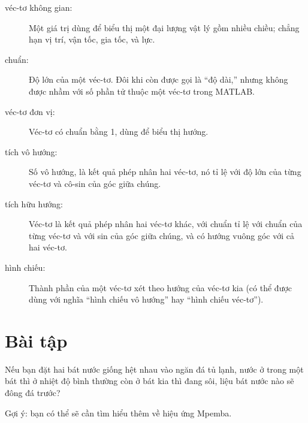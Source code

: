 \documentclass[12pt]{book}
\begin{document}
\begin{description}

\item[véc-tơ không gian:] Một giá trị dùng để biểu thị một đại lượng
vật lý gồm nhiều chiều; chẳng hạn vị trí, vận tốc, gia tốc, và lực.

\item[chuẩn:] Độ lớn của một véc-tơ. Đôi khi còn được gọi là ``độ dài,''
nhưng không được nhầm với số phần tử thuộc một véc-tơ trong MATLAB.

\item[véc-tơ đơn vị:] Véc-tơ có chuẩn bằng 1, dùng để biểu thị hướng.

\item[tích vô hướng:] Số vô hướng, là kết quả phép nhân hai véc-tơ, nó tỉ lệ với
độ lớn của từng véc-tơ và cô-sin của góc giữa chúng.

\item[tích hữu hướng:] Véc-tơ là kết quả phép nhân hai véc-tơ khác, với
chuẩn tỉ lệ với chuẩn của từng véc-tơ và với sin của góc giữa chúng,
và có hướng vuông góc với cả hai véc-tơ.

\item[hình chiếu:] Thành phần của một véc-tơ xét theo hướng của véc-tơ
kia (có thể được dùng với nghĩa ``hình chiếu vô hướng'' hay
``hình chiếu véc-tơ'').

\end{description}


\section{Bài tập}

\begin{ex}
Nếu bạn đặt hai bát nước giống hệt nhau vào ngăn đá tủ lạnh, nước ở
trong một bát thì ở nhiệt độ bình thường còn ở bát kia thì đang sôi, liệu
bát nước nào sẽ đông đá trước?

Gợi ý: bạn có thể sẽ cần tìm hiểu thêm về hiệu ứng Mpemba.

\end{ex}
\end{document}
